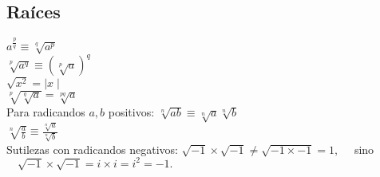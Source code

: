 
\subsection{Raíces}
$ a ^ {\frac{p}{q}} \equiv \sqrt[q]{a^p} $\\
$ \sqrt[p]{a^q} \equiv (\sqrt[p]{a})^q $\\
$\sqrt{x^2} = \mid x \mid$\\
$\sqrt[p]{\sqrt[q]{a}} = \sqrt[pq]{a}$\\
Para radicandos $a, b$ positivos:
$\sqrt[n]{ab} \equiv \sqrt[n]{a} \sqrt[n]{b}$\\
$\sqrt[n]{\frac{a}{b}} \equiv \frac{\sqrt[n]{a}}{\sqrt[n]{b}}$\\
Sutilezas con radicandos negativos:
$\sqrt{-1}\times\sqrt{-1} \neq \sqrt{-1 \times -1} = 1,\quad$ sino $\quad\sqrt{-1}\times\sqrt{-1} = i \times i = i^2 = -1.$\\
